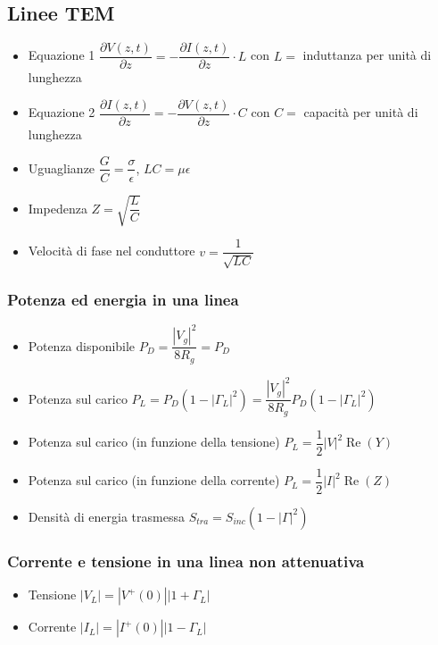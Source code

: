 \documentclass{article}
\begin{document}
\subsection{Linee TEM}
\begin{itemize}
	\item Equazione 1 \( \dfrac{\partial V(z, t)}{\partial z} = - \dfrac{\partial I(z, t)}{\partial z} \cdot L\) con \(L = \) induttanza per unità di lunghezza
	\item Equazione 2 \( \dfrac{\partial I(z, t)}{\partial z} = - \dfrac{\partial V(z, t)}{\partial z} \cdot C\) con \(C = \) capacità per unità di lunghezza
	\item Uguaglianze \( \dfrac{G}{C} = \dfrac{\sigma}{\epsilon} \), \(L C = \mu \epsilon  \)
	\item Impedenza \( Z = \sqrt{\dfrac{L}{C}} \)
	\item Velocità di fase nel conduttore \( v = \dfrac{1}{\sqrt{LC}} \)
\end{itemize}

\subsubsection{Potenza ed energia in una linea}
\begin{itemize}
	\item Potenza disponibile \( P_D = \dfrac{|V_g|^2}{8 R_g} = P_D \)
	\item Potenza sul carico \( P_L = P_D ( 1 - | \Gamma_L | ^ 2 ) = \dfrac{|V_g|^2}{8 R_g} P_D ( 1 - | \Gamma_L | ^ 2 ) \)
	\item Potenza sul carico (in funzione della tensione) \( P_L = \dfrac{1}{2} |V|^2  \operatorname{Re}(Y) \)
	\item Potenza sul carico (in funzione della corrente) \( P_L = \dfrac{1}{2} |I|^2  \operatorname{Re}(Z) \)
	\item Densità di energia trasmessa \( S_{tra} = S_{inc} \left( 1 - \left|\Gamma \right| ^ 2 \right) \)
\end{itemize}

\subsubsection{Corrente e tensione in una linea non attenuativa}
\begin{itemize}
	\item Tensione \(|V_L| = \left| V^+(0) \right| \left|1 + \Gamma_L \right|\)
	\item Corrente \(|I_L| = \left| I^+(0) \right| \left|1 - \Gamma_L \right|\)
\end{itemize}
\end{document}
